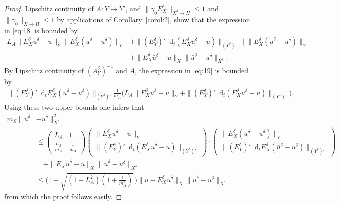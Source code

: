 \documentclass{amsart}
\numberwithin{equation}{section}
\newcommand{\1}{\mathbb 1}
\newcommand*\diff{\mathop{}\!\mathrm{d}}
\begin{document}
\begin{proof}
Lipschitz continuity of $A \colon Y \rightarrow Y'$, and $\|\gamma_0 E_X^\delta\|_{X^\delta \rightarrow H}\leq 1$ and $\|\gamma_0\|_{X \rightarrow H}\leq 1$ by applications of  Corollary~\ref{corol:2}, show that the expression in \eqref{eq:18} is bounded by
\begin{align*}
L_A \|E_X^\delta \bar{u}^\delta-u\|_Y \|E_X^\delta(\bar{u}^\delta-u^\delta)\|_Y&+\|(E_Y^\delta)' \diff_t(E_X^\delta \bar{u}^\delta-u)\|_{(Y^\delta)'} \|\|E_X^\delta(\bar{u}^\delta-u^\delta)\|_Y\\
&+
\|E_X^\delta \bar{u}^\delta-u\|_{X}\|\bar{u}^\delta-u^\delta\|_{X^\delta}.
\end{align*}
By Lipschitz continuity of $(A_Y^\delta)^{-1}$ and $A$, the expression in \eqref{eq:19} is bounded by
\begin{align*}
\|(E_Y^\delta)' \diff_tE_X^\delta( \bar{u}^\delta-u^\delta)\|_{(Y^\delta)'} \tfrac{1}{m_A}\Big(L_A \|E_X^\delta \bar{u}^\delta-u\|_Y+\|(E_Y^\delta)' \diff_t(E_X^\delta \bar{u}^\delta-u)\|_{(Y^\delta)'}\big).
\end{align*}
Using these two upper bounds one infers that
\begin{align*}
    m_{S} \| \bar{u}^\delta&-u^\delta\|_{X^\delta}^2 \\
    & \leq \begin{pmatrix}
        L_A & 1 \\
        \frac{L_A}{m_A} & \frac{1}{m_A}
    \end{pmatrix} \begin{pmatrix}
        \|E_X^\delta \bar{u}^\delta-u\|_Y \\
        \|(E_Y^\delta)' \diff_t(E_X^\delta \bar{u}^\delta-u)\|_{(Y^\delta)'}
    \end{pmatrix} \cdot \begin{pmatrix}
        \|E_X^\delta(\bar{u}^\delta-u^\delta)\|_Y \\
        \|(E_Y^\delta)' \diff_tE_X^\delta( \bar{u}^\delta-u^\delta)\|_{(Y^\delta)'}
    \end{pmatrix}
    \\
    & \,\,\,\,\,\,+ \|E_X \bar{u}^\delta -u\|_X \|\bar{u}^\delta-u^\delta\|_{X^\delta}\\
    & \leq \big(1+ \sqrt{(1+L_A^2)(1 + \tfrac{1}{m_A^2})}\,\big) \| u-E_X^\delta \bar{u}^\delta\|_{X} \| \bar{u}^\delta-u^\delta\|_{X^\delta}  
\end{align*}
from which the proof follows easily.
\end{proof}
\end{document}
